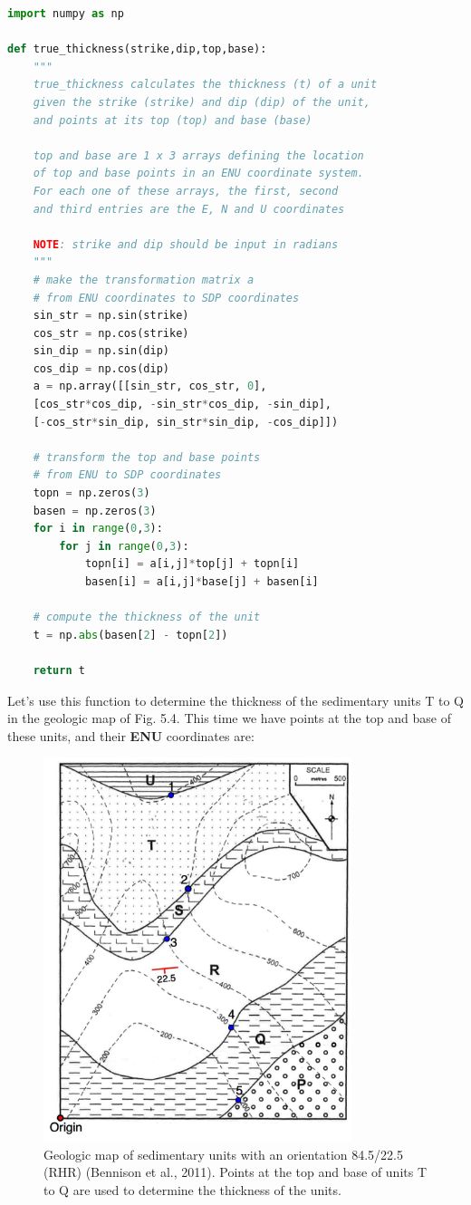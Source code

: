 \documentclass[a4paper , 12pt]{book}
\begin{document}
\begin{center}
\begin{lstlisting}[language=Python, frame=single]
import numpy as np

def true_thickness(strike,dip,top,base):
	"""
	true_thickness calculates the thickness (t) of a unit
	given the strike (strike) and dip (dip) of the unit,
	and points at its top (top) and base (base)
	
	top and base are 1 x 3 arrays defining the location
	of top and base points in an ENU coordinate system.
	For each one of these arrays, the first, second
	and third entries are the E, N and U coordinates
	
	NOTE: strike and dip should be input in radians
	"""
	# make the transformation matrix a 
	# from ENU coordinates to SDP coordinates
	sin_str = np.sin(strike)
	cos_str = np.cos(strike)
	sin_dip = np.sin(dip)
	cos_dip = np.cos(dip)
	a = np.array([[sin_str, cos_str, 0],
	[cos_str*cos_dip, -sin_str*cos_dip, -sin_dip],
	[-cos_str*sin_dip, sin_str*sin_dip, -cos_dip]])
	
	# transform the top and base points
	# from ENU to SDP coordinates
	topn = np.zeros(3)
	basen = np.zeros(3)
	for i in range(0,3):
		for j in range(0,3):
			topn[i] = a[i,j]*top[j] + topn[i]
			basen[i] = a[i,j]*base[j] + basen[i]
	
	# compute the thickness of the unit
	t = np.abs(basen[2] - topn[2])
	
	return t
\end{lstlisting}
\end{center}
 
Let's use this function to determine the thickness of the sedimentary units T to Q in the geologic map of Fig. 5.4. This time we have points at the top and base of these units, and their \textbf{ENU} coordinates are:

 \begin{figure}[ht]
    \centering
    \includegraphics[width=9cm]{ch5f4.pdf}
    \caption{Geologic map of sedimentary units with an orientation 84.5/22.5 (RHR) (Bennison et al.,  2011). Points at the top and base of units T to Q are used to determine the thickness of the units.}
\end{figure}
\end{document}
